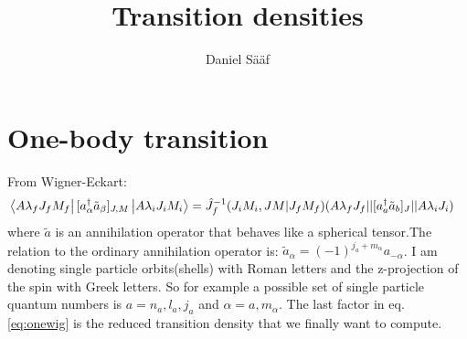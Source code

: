 \documentclass[12pt,a4paper]{article}
\author{Daniel Sääf}
\title{Transition densities}
\newcommand{\matrixel}[3]{\left\langle #1 \vphantom{#2#3} \right|
 #2 \left| #3 \vphantom{#1#2} \right\rangle} %
\begin{document}
\maketitle
\section{One-body transition}
From Wigner-Eckart:
\begin{align}
&\matrixel{A \lambda_fJ_fM_f}{[a^{\dagger}_{\alpha}\tilde{a}_{\beta}]_{J,M}}{A \lambda_i J_i M_i} =\hat{J}^{-1}_f(J_iM_i,JM|J_fM_f)(A\lambda_f J_f || [a^{\dagger}_a \tilde{a}_b]_J||A\lambda_i J_i)
\label{eq:onewig}
\end{align}
where $\tilde{a}$ is an annihilation operator that behaves like a spherical tensor.The relation to the ordinary annihilation operator is: $\tilde{a}_{\alpha}=(-1)^{j_a+m_\alpha}a_{-\alpha}$. I am denoting single particle orbits(shells) with Roman letters and the z-projection of the spin with Greek letters. So for example a possible set of single particle quantum numbers is $a=n_a,l_a,j_a$ and $\alpha=a, m_\alpha$. 
The last factor in eq. \ref{eq:onewig} is the reduced transition density that we finally want to compute.
\end{document}
